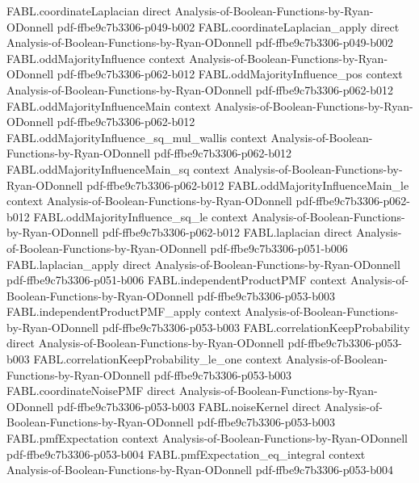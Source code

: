 \begin{theorem}
\proofstep
  {FABL.coordinateLaplacian}
  {direct}
  {Analysis-of-Boolean-Functions-by-Ryan-ODonnell}
  {pdf-ffbe9c7b3306-p049-b002}
\proofstep
  {FABL.coordinateLaplacian_apply}
  {direct}
  {Analysis-of-Boolean-Functions-by-Ryan-ODonnell}
  {pdf-ffbe9c7b3306-p049-b002}
\proofstep
  {FABL.oddMajorityInfluence}
  {context}
  {Analysis-of-Boolean-Functions-by-Ryan-ODonnell}
  {pdf-ffbe9c7b3306-p062-b012}
\proofstep
  {FABL.oddMajorityInfluence_pos}
  {context}
  {Analysis-of-Boolean-Functions-by-Ryan-ODonnell}
  {pdf-ffbe9c7b3306-p062-b012}
\proofstep
  {FABL.oddMajorityInfluenceMain}
  {context}
  {Analysis-of-Boolean-Functions-by-Ryan-ODonnell}
  {pdf-ffbe9c7b3306-p062-b012}
\proofstep
  {FABL.oddMajorityInfluence_sq_mul_wallis}
  {context}
  {Analysis-of-Boolean-Functions-by-Ryan-ODonnell}
  {pdf-ffbe9c7b3306-p062-b012}
\proofstep
  {FABL.oddMajorityInfluenceMain_sq}
  {context}
  {Analysis-of-Boolean-Functions-by-Ryan-ODonnell}
  {pdf-ffbe9c7b3306-p062-b012}
\proofstep
  {FABL.oddMajorityInfluenceMain_le}
  {context}
  {Analysis-of-Boolean-Functions-by-Ryan-ODonnell}
  {pdf-ffbe9c7b3306-p062-b012}
\proofstep
  {FABL.oddMajorityInfluence_sq_le}
  {context}
  {Analysis-of-Boolean-Functions-by-Ryan-ODonnell}
  {pdf-ffbe9c7b3306-p062-b012}
\proofstep
  {FABL.laplacian}
  {direct}
  {Analysis-of-Boolean-Functions-by-Ryan-ODonnell}
  {pdf-ffbe9c7b3306-p051-b006}
\proofstep
  {FABL.laplacian_apply}
  {direct}
  {Analysis-of-Boolean-Functions-by-Ryan-ODonnell}
  {pdf-ffbe9c7b3306-p051-b006}
\proofstep
  {FABL.independentProductPMF}
  {context}
  {Analysis-of-Boolean-Functions-by-Ryan-ODonnell}
  {pdf-ffbe9c7b3306-p053-b003}
\proofstep
  {FABL.independentProductPMF_apply}
  {context}
  {Analysis-of-Boolean-Functions-by-Ryan-ODonnell}
  {pdf-ffbe9c7b3306-p053-b003}
\proofstep
  {FABL.correlationKeepProbability}
  {direct}
  {Analysis-of-Boolean-Functions-by-Ryan-ODonnell}
  {pdf-ffbe9c7b3306-p053-b003}
\proofstep
  {FABL.correlationKeepProbability_le_one}
  {context}
  {Analysis-of-Boolean-Functions-by-Ryan-ODonnell}
  {pdf-ffbe9c7b3306-p053-b003}
\proofstep
  {FABL.coordinateNoisePMF}
  {direct}
  {Analysis-of-Boolean-Functions-by-Ryan-ODonnell}
  {pdf-ffbe9c7b3306-p053-b003}
\proofstep
  {FABL.noiseKernel}
  {direct}
  {Analysis-of-Boolean-Functions-by-Ryan-ODonnell}
  {pdf-ffbe9c7b3306-p053-b003}
\proofstep
  {FABL.pmfExpectation}
  {context}
  {Analysis-of-Boolean-Functions-by-Ryan-ODonnell}
  {pdf-ffbe9c7b3306-p053-b004}
\proofstep
  {FABL.pmfExpectation_eq_integral}
  {context}
  {Analysis-of-Boolean-Functions-by-Ryan-ODonnell}
  {pdf-ffbe9c7b3306-p053-b004}

\end{theorem}
